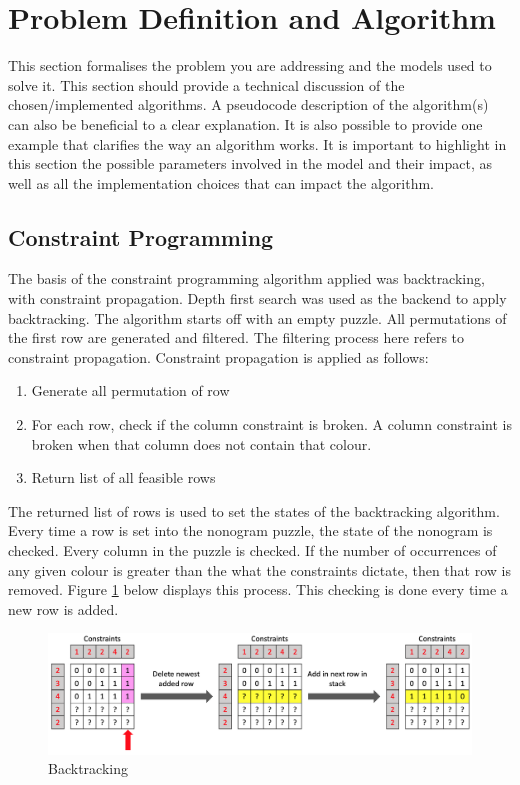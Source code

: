\documentclass{svproc}
\begin{document}
\section{Problem Definition and Algorithm}
This section formalises the problem you are addressing and the models used to solve it. This section should provide a technical discussion of the chosen/implemented algorithms. A pseudocode description of the algorithm(s) can also be beneficial to a clear explanation. It is also possible to provide one example that clarifies the way an algorithm works. It is important to highlight in this section the possible parameters involved in the model and their impact, as well as all the implementation choices that can impact the algorithm.

\subsection{Constraint Programming}
The basis of the constraint programming algorithm applied was backtracking, with constraint propagation. Depth first search was used as the backend to apply backtracking. The algorithm starts off with an empty puzzle. All permutations of the first row are generated and filtered. The filtering process here refers to  constraint propagation. Constraint propagation is applied as follows:

\begin{enumerate}
    \item Generate all permutation of row
    \item For each row, check if the column constraint is broken. A column constraint is broken when that column does not contain that colour.
    \item Return list of all feasible rows
\end{enumerate}

The returned list of rows is used to set the states of the backtracking algorithm. Every time a row is set into the nonogram puzzle, the state of the nonogram is checked. Every column in the puzzle is checked. If the number of occurrences of any given colour is greater than the what the constraints dictate, then that row is removed. Figure \ref{fig:Backtrack} below displays this process. This checking is done every time a new row is added.

\begin{figure}[h]
    \centering
    \includegraphics[scale=0.36]{Backtracking.png}
    \caption{Backtracking}
    \label{fig:Backtrack}
\end{figure}
\end{document}
